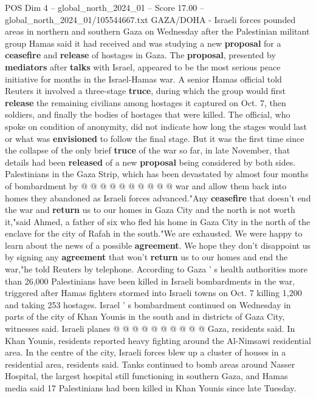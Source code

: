\begin{textsample}{POS Dim 4 – global\_north\_2024\_01 – Score 17.00 – global\_north\_2024\_01/105544667.txt}  \label{ex:f4_pos_346}
GAZA/DOHA - Israeli forces pounded areas in northern and southern Gaza on Wednesday after the Palestinian militant group Hamas said it had received and was studying a new \textbf{proposal} for a \textbf{ceasefire} and \textbf{release} of hostages in Gaza.
The \textbf{proposal}, presented by \textbf{mediators} after \textbf{talks} with Israel, appeared to be the most serious peace initiative for months in the Israel-Hamas war.
A senior Hamas official told Reuters it involved a three-stage \textbf{truce}, during which the group would first \textbf{release} the remaining civilians among hostages it captured on Oct. 7, then soldiers, and finally the bodies of hostages that were killed.
The official, who spoke on condition of anonymity, did not indicate how long the stages would last or what was \textbf{envisioned} to follow the final stage.
But it was the first time since the collapse of the only brief \textbf{truce} of the war so far, in late November, that details had been \textbf{released} of a new \textbf{proposal} being considered by both sides.
Palestinians in the Gaza Strip, which has been devastated by almost four months of bombardment by @ @ @ @ @ @ @ @ @ @ war and allow them back into homes they abandoned as Israeli forces advanced."Any \textbf{ceasefire} that doesn't end the war and \textbf{return} us to our homes in Gaza City and the north is not worth it,"said Ahmed, a father of six who fled his home in Gaza City in the north of the enclave for the city of Rafah in the south."We are exhausted.
We were happy to learn about the news of a possible \textbf{agreement}.
We hope they don't disappoint us by signing any \textbf{agreement} that won't \textbf{return} us to our homes and end the war,"he told Reuters by telephone.
According to Gaza ' s health authorities more than 26,000 Palestinians have been killed in Israeli bombardments in the war, triggered after Hamas fighters stormed into Israeli towns on Oct. 7 killing 1,200 and taking 253 hostages.
Israel ' s bombardment continued on Wednesday in parts of the city of Khan Younis in the south and in districts of Gaza City, witnesses said.
Israeli planes @ @ @ @ @ @ @ @ @ @ Gaza, residents said.
In Khan Younis, residents reported heavy fighting around the Al-Nimsawi residential area.
In the centre of the city, Israeli forces blew up a cluster of houses in a residential area, residents said.
Tanks continued to bomb areas around Nasser Hospital, the largest hospital still functioning in southern Gaza, and Hamas media said 17 Palestinians had been killed in Khan Younis since late Tuesday.

\end{textsample}
